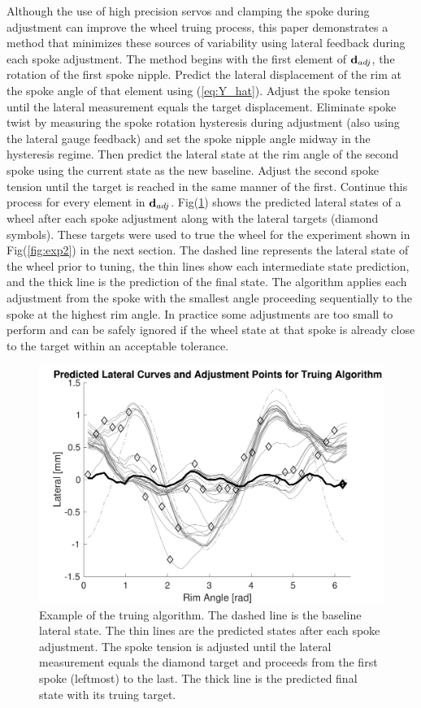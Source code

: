 \documentclass[journal]{IEEEtran}
\begin{document}
Although the use of high precision servos and clamping the spoke during adjustment can improve the wheel truing process, this paper demonstrates a method that minimizes these sources of variability using lateral feedback during each spoke adjustment. The method begins with the first element of ${\bf d}_{adj}$, the rotation of the first spoke nipple.  Predict the lateral displacement of the rim at the spoke angle of that element using (\ref{eq:Y_hat}).  Adjust the spoke tension until the lateral measurement equals the target displacement. Eliminate spoke twist by measuring the spoke rotation hysteresis during adjustment (also using the lateral gauge feedback) and set the spoke nipple angle midway in the hysteresis regime. Then predict the lateral state at the rim angle of the second spoke using the current state as the new baseline.  Adjust the second spoke tension until the target is reached in the same manner of the first. Continue this process for every element in ${\bf d}_{adj}$.  Fig(\ref{fig:algo}) shows the predicted lateral states of a wheel after each spoke adjustment along with the lateral targets (diamond symbols). These targets were used to true the wheel for the experiment shown in Fig(\ref{fig:exp2}) in the next section. The dashed line represents the lateral state of the wheel prior to tuning, the thin lines show each intermediate state prediction, and the thick line is the prediction of the final state. The algorithm applies each adjustment from the spoke with the smallest angle proceeding sequentially to the spoke at the highest rim angle. In practice some adjustments are too small to perform and can be safely ignored if the wheel state at that spoke is already close to the target within an acceptable tolerance.

\begin{figure}[!t]
\centering
\includegraphics[width=3.5 in]{./figs/algo}
\caption{Example of the truing algorithm. The dashed line is the baseline lateral state.  The thin lines are the predicted states after each spoke adjustment. The spoke tension is adjusted until the lateral measurement equals the diamond target and proceeds from the first spoke (leftmost) to the last.  The thick line is the predicted final state with its truing target. }
\label{fig:algo}
\end{figure}
\end{document}
